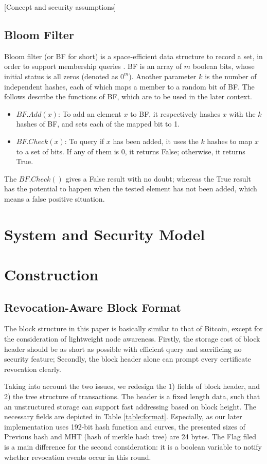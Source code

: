 \documentclass[conference]{IEEEtran}
\begin{document}
[Concept and security assumptions]

\subsection{Bloom Filter}
Bloom filter (or BF for short) is a space-efficient data structure to record a set, in order to support membership queries \cite{Bloom1970, broder2004network}.
BF is an array of $m$ boolean bits, whose initial status is all zeros (denoted as $0^m$). Another parameter $k$ is the number of independent hashes, each of which maps a member to a random bit of BF. The follows describe the functions of BF, which are to be used in the later context.

\begin{itemize}
    \item $BF.Add(x)$: To add an element $x$ to BF, it respectively hashes $x$ with the $k$ hashes of BF, and sets each of the mapped bit to 1.
	\item $BF.Check(x)$: To query if $x$ has been added, it uses the $k$ hashes to map $x$ to a set of bits. If any of them is 0, it returns False; otherwise, it returns True. 
\end{itemize}

The $BF.Check()$ gives a False result with no doubt; whereas the True result has the potential to happen when the tested element has not been added, which means a false positive situation.


\section{System and Security Model}

\section{Construction}
\subsection{Revocation-Aware Block Format}
The block structure in this paper is basically similar to that of Bitcoin, except for the consideration of lightweight node awareness. Firstly, the storage cost of block header should be as short as possible with efficient query and sacrificing no security feature; Secondly, the block header alone can prompt every certificate revocation clearly. 

Taking into account the two issues, we redesign the 1) fields of block header, and 2) the tree structure of transactions. The header is a fixed length data, such that an unstructured storage can support fast addressing based on block height. The necessary fields are depicted in Table \ref{table:format}. Especially, as our later implementation uses 192-bit hash function and curves, the presented sizes of Previous hash and MHT (hash of merkle hash tree) are 24 bytes. The Flag filed is a main difference for the second consideration: it is a boolean variable to notify whether revocation events occur in this round.
\end{document}
